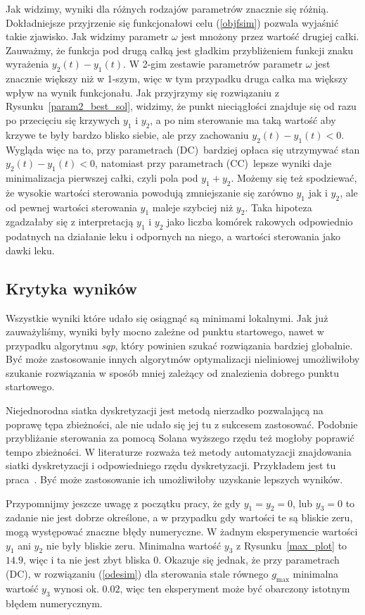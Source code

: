 \documentclass[11pt]{article}
\begin{document}
Jak widzimy, wyniki dla różnych rodzajów parametrów znacznie się różnią. Dokładniejsze przyjrzenie się funkcjonałowi celu (\ref{objfsim}) pozwala wyjaśnić takie zjawisko. Jak widzimy parametr $\omega$ jest mnożony przez wartość drugiej całki. Zauważmy, że funkcja pod drugą całką jest gładkim przybliżeniem funkcji znaku wyrażenia $y_2(t) - y_1(t)$. W 2-gim zestawie parametrów parametr $\omega$ jest znacznie większy niż w 1-szym, więc w tym przypadku druga całka ma większy wpływ na wynik funkcjonału. Jak przyjrzymy się rozwiązaniu z Rysunku~\ref{param2_best_sol}, widzimy, że punkt nieciągłości znajduje się od razu po przecięciu się krzywych $y_1$ i $y_2$, a po nim sterowanie ma taką wartość aby krzywe te były bardzo blisko siebie, ale przy zachowaniu $y_2(t) - y_1(t) < 0$. Wygląda więc na to, przy parametrach (DC)\ bardziej opłaca się utrzymywać stan $y_2(t) - y_1(t) < 0$, natomiast przy parametrach (CC)\ lepsze wyniki daje minimalizacja pierwszej całki, czyli pola pod $y_1 + y_2$. Możemy się też spodziewać, że wysokie wartości sterowania powodują zmniejszanie się zarówno $y_1$ jak i $y_2$, ale od pewnej wartości sterowania $y_1$ maleje szybciej niż $y_2$. Taka hipoteza zgadzałaby się z interpretacją $y_1$ i $y_2$ jako liczba komórek rakowych odpowiednio podatnych na działanie leku i odpornych na niego, a wartości sterowania jako dawki leku.

\subsection{Krytyka wyników}
Wszystkie wyniki które udało się osiągnąć są minimami lokalnymi. Jak już zauważyliśmy, wyniki były mocno zależne od punktu startowego, nawet w przypadku algorytmu {\it sqp}, który powinien szukać rozwiązania bardziej globalnie. Być może zastosowanie innych algorytmów optymalizacji nieliniowej umożliwiłoby szukanie rozwiązania w sposób mniej zależący od znalezienia dobrego punktu startowego.

Niejednorodna siatka dyskretyzacji jest metodą nierzadko pozwalającą na poprawę tępa zbieżności, ale nie udało się jej tu z sukcesem zastosować. Podobnie przybliżanie sterowania za pomocą Solana wyższego rzędu też mogłoby poprawić tempo zbieżności. W literaturze rozważa też metody automatyzacji znajdowania siatki dyskretyzacji i odpowiedniego rzędu dyskretyzacji. Przykładem jest tu praca~\cite{Rao-ph}. Być może zastosowanie ich umożliwiłoby uzyskanie lepszych wyników.

Przypomnijmy jeszcze uwagę z początku pracy, że gdy $y_1 = y_2 = 0$, lub $y_3 = 0$ to zadanie nie jest dobrze określone, a w przypadku gdy wartości te są bliskie zeru, mogą występować znaczne błędy numeryczne. W żadnym eksperymencie wartości $y_1$ ani $y_2$ nie były bliskie zeru. Minimalna wartość $y_3$ z Rysunku~\ref{max_plot} to $14.9$, więc i ta nie jest zbyt bliska 0. Okazuje się jednak, że przy parametrach (DC), w rozwiązaniu (\ref{odesim}) dla sterowania stale równego $g_{\max}$ minimalna wartość $y_3$ wynosi ok. $0.02$, więc ten eksperyment może być obarczony istotnym błędem numerycznym.

\newpage{}
{}

\end{document}
